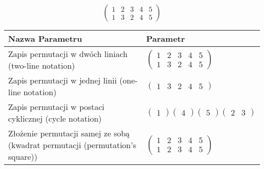 \documentclass[12pt]{article}
\begin{document}
\subsection{}
\begin{center}
\[
\begin{pmatrix}
	1 & 2 & 3 & 4 & 5 \\ 
	1 & 3 & 2 & 4 & 5 
\end{pmatrix}
\]

\begin{tabular}{|m{0.6\linewidth}|m{0.4\linewidth}|}
	\hline
	Nazwa Parametru & Parametr \\
	\hline
	Zapis permutacji w dwóch liniach (two-line notation) & $\begin{pmatrix} 1 & 2 & 3 & 4 & 5 \\ 
1 & 3 & 2 & 4 & 5 \end{pmatrix}$ \\ 
	\hline
	Zapis permutacji w jednej linii (one-line notation) & $\begin{pmatrix} 1 & 3 & 2 & 4 & 5 \end{pmatrix}$ \\ 
	\hline
	Zapis permutacji w postaci cyklicznej (cycle notation) & $\begin{pmatrix} 1 \end{pmatrix} \begin{pmatrix} 4 \end{pmatrix} \begin{pmatrix} 5 \end{pmatrix} \begin{pmatrix} 2 & 3 \end{pmatrix} $ \\ 
	\hline
	Złożenie permutacji samej ze sobą (kwadrat permutacji (permutation's square)) & $\begin{pmatrix} 1 & 2 & 3 & 4 & 5 \\ 
1 & 2 & 3 & 4 & 5 \end{pmatrix}$ \\ 
	\hline
\end{tabular}
\end{center}
\end{document}
